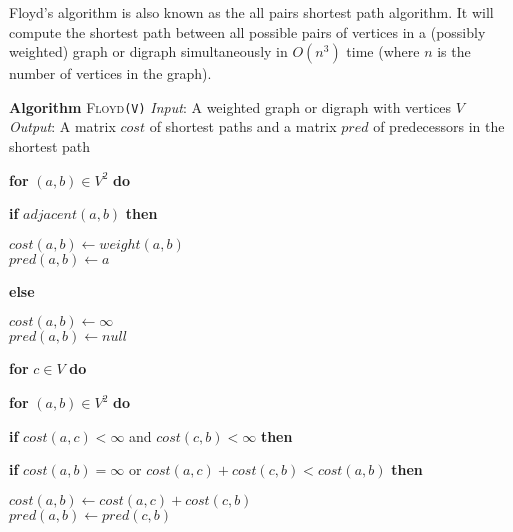 \documentclass{article}
\newcommand{\Lindent}{0.4in}
\newenvironment{Lalgorithm}[4]{
\textbf{Algorithm} \textsc{#1}\texttt{(#2)}\newline
\textit{Input}: #3\newline
\textit{Output}: #4\newline

}{}
\newcommand{\Lif}[2]{\textbf{if} #1 \textbf{then}\\\hspace*{\Lindent}\parbox{\textwidth}{#2}}
\newcommand{\Lelse}[1]{\textbf{else}\\\hspace*{\Lindent}\parbox{\textwidth}{#1}}
\newcommand{\Lfor}[2]{\textbf{for} #1 \textbf{do}\\\hspace*{\Lindent}\parbox{\textwidth}{#2}}
\begin{document}
Floyd's algorithm is also known as the all pairs shortest path algorithm.  It will compute the shortest path between all possible pairs of vertices in a (possibly weighted) graph or digraph simultaneously in $O(n^3)$ time (where $n$ is the number of vertices in the graph).

\begin{Lalgorithm}{Floyd}{V}{A weighted graph or digraph with vertices $V$}{A matrix $cost$ of shortest paths and a matrix $pred$ of predecessors in the shortest path}
\Lfor{$(a,b) \in V^2$}{
\Lif{$adjacent(a,b)$}{
$cost(a,b) \gets weight(a,b)$\\
$pred(a,b) \gets a$
}
\Lelse{
$cost(a,b) \gets \infty$\\
$pred(a,b) \gets null$
}
}

\Lfor{$c \in V$}{
\Lfor{$(a,b) \in V^2$}{
\Lif{$cost(a,c) < \infty$ and $cost(c,b) < \infty$}{
\Lif{$cost(a,b) = \infty$ or $cost(a,c) + cost(c,b) < cost(a,b)$}{
$cost(a,b) \gets cost(a,c)+cost(c,b)$ \\
$pred(a,b) \gets pred(c,b)$
}
}
}
}

\end{Lalgorithm}
\end{document}
